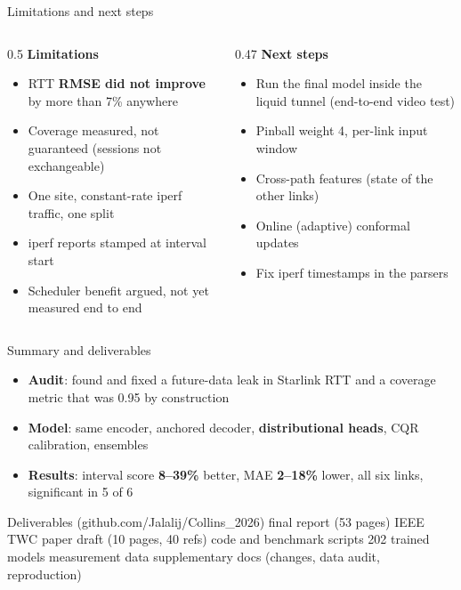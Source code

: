 \documentclass[aspectratio=169,11pt]{beamer}
\newcommand{\takeaway}[1]{\vfill\centering{\fontsize{11.5}{14}\selectfont\color{Navy}\bfseries #1}\par}
\newcommand{\good}[1]{\textcolor{Good}{\textbf{#1}}}
\begin{document}
\begin{frame}{Limitations and next steps}
  \begin{columns}[T,onlytextwidth]
  \begin{column}{0.5\textwidth}
  \textbf{Limitations}
  \begin{itemize}\small
    \item RTT \textbf{RMSE did not improve} by more than 7\% anywhere
    \item Coverage measured, not guaranteed (sessions not exchangeable)
    \item One site, constant-rate iperf traffic, one split
    \item iperf reports stamped at interval start
    \item Scheduler benefit argued, not yet measured end to end
  \end{itemize}
  \end{column}
  \begin{column}{0.47\textwidth}
  \textbf{Next steps}
  \begin{itemize}\small
    \item Run the final model inside the liquid tunnel (end-to-end video test)
    \item Pinball weight 4, per-link input window
    \item Cross-path features (state of the other links)
    \item Online (adaptive) conformal updates
    \item Fix iperf timestamps in the parsers
  \end{itemize}
  \end{column}
  \end{columns}
\end{frame}

\begin{frame}{Summary and deliverables}
  \begin{itemize}
    \item \textbf{Audit}: found and fixed a future-data leak in Starlink RTT and a coverage metric that was 0.95 by construction
    \item \textbf{Model}: same encoder, anchored decoder, \textbf{distributional heads}, CQR calibration, ensembles
    \item \textbf{Results}: interval score \good{8--39\%} better, MAE \good{2--18\%} lower, all six links, significant in 5 of 6
  \end{itemize}
  \vspace{0.2cm}
  \begin{block}{Deliverables (github.com/Jalalij/Collins\_2026)}
  \small
  final report (53 pages) \textbullet{} IEEE TWC paper draft (10 pages, 40 refs) \textbullet{} code and benchmark scripts \textbullet{} 202 trained models \textbullet{} measurement data \textbullet{} supplementary docs (changes, data audit, reproduction)
  \end{block}
  \takeaway{Questions?}
\end{frame}
\end{document}

